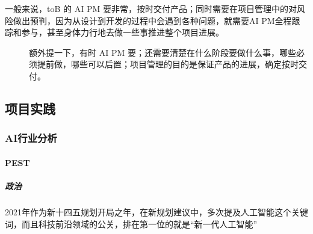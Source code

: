\documentclass[letterpaper,11pt,english]{sphinxmanual}
\begin{document}
\begin{center}\end{center} 
\begin{description}
\item[{一般来说，toB 的 AI PM 要非常，按时交付产品；同时需要在项目管理中的对风险做出预判，因为从设计到开发的过程中会遇到各种问题，就需要AI PM全程跟踪和参与，甚至身体力行地去做一些事推进整个项目进展。}] \leavevmode
额外提一下，有时 AI PM
要；还需要清楚在什么阶段要做什么事，哪些必须提前做，哪些可以后置；项目管理的目的是保证产品的进展，确定按时交付。

\end{description}


\subsection{项目实践}
\label{\detokenize{chapter_project/index:chap-project}}\label{\detokenize{chapter_project/index:id1}}\label{\detokenize{chapter_project/index::doc}}

\subsubsection{AI行业分析}
\label{\detokenize{chapter_project/AI_industry_analysis:ai}}\label{\detokenize{chapter_project/AI_industry_analysis::doc}}

\paragraph{PEST}
\label{\detokenize{chapter_project/AI_industry_analysis:pest}}

\subparagraph{政治}
\label{\detokenize{chapter_project/AI_industry_analysis:id1}}
2021年作为新十四五规划开局之年，在新规划建议中，多次提及人工智能这个关键词，而且科技前沿领域的公关，排在第一位的就是“新一代人工智能”%
\begin{footnote}[631]\sphinxAtStartFootnote
{}
%
\end{footnote}

%
\begin{footnote}[632]\sphinxAtStartFootnote
{}
%
\end{footnote}
\end{document}
